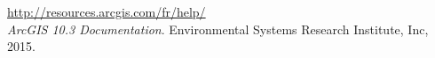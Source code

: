\begin{thebibliography}{ABC}

        \url{http://resources.arcgis.com/fr/help/}\\
        \emph{ArcGIS 10.3 Documentation}. 
        Environmental Systems Research Institute, Inc, 
        2015.

\end{thebibliography}